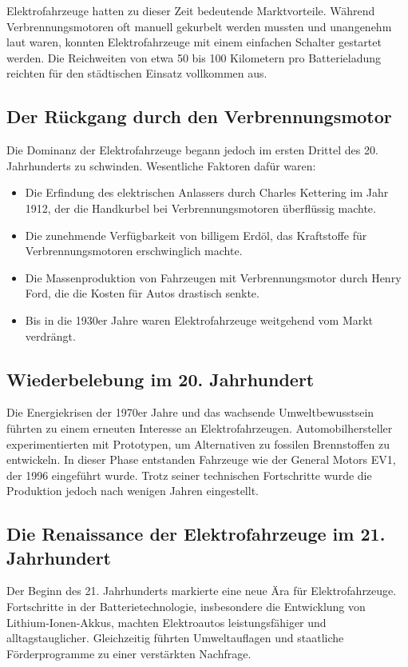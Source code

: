 Elektrofahrzeuge hatten zu dieser Zeit bedeutende Marktvorteile. Während Verbrennungsmotoren oft manuell gekurbelt werden mussten und unangenehm laut waren, konnten Elektrofahrzeuge mit einem einfachen Schalter gestartet werden. \autocite{enbw_elektroautos_vorteile_nachteile} Die Reichweiten von etwa 50 bis 100 Kilometern pro Batterieladung reichten für den städtischen Einsatz vollkommen aus. \autocite{adac_stromverbrauch_elektroautos}

\subsection*{Der Rückgang durch den Verbrennungsmotor}

Die Dominanz der Elektrofahrzeuge begann jedoch im ersten Drittel des 20. Jahrhunderts zu schwinden. Wesentliche Faktoren dafür waren:
\begin{itemize}
	\item Die Erfindung des elektrischen Anlassers durch Charles Kettering im Jahr 1912, der die Handkurbel bei Verbrennungsmotoren überflüssig machte. \autocite{greelane_charles_kettering}
	\item Die zunehmende Verfügbarkeit von billigem Erdöl, das Kraftstoffe für Verbrennungsmotoren erschwinglich machte. \autocite{tanke_guenstig_oelpreise}
	\item Die Massenproduktion von Fahrzeugen mit Verbrennungsmotor durch Henry Ford, die die Kosten für Autos drastisch senkte. \autocite{ardalpha_henry_ford_geschichte}
	\item Bis in die 1930er Jahre waren Elektrofahrzeuge weitgehend vom Markt verdrängt. \autocite{ardalpha_henry_ford_geschichte}
\end{itemize}

\subsection*{Wiederbelebung im 20. Jahrhundert}

Die Energiekrisen der 1970er Jahre und das wachsende Umweltbewusstsein führten zu einem erneuten Interesse an Elektrofahrzeugen. Automobilhersteller experimentierten mit Prototypen, um Alternativen zu fossilen Brennstoffen zu entwickeln. In dieser Phase entstanden Fahrzeuge wie der General Motors EV1, der 1996 eingeführt wurde. Trotz seiner technischen Fortschritte wurde die Produktion jedoch nach wenigen Jahren eingestellt.

\subsection*{Die Renaissance der Elektrofahrzeuge im 21. Jahrhundert}
Der Beginn des 21. Jahrhunderts markierte eine neue Ära für Elektrofahrzeuge. Fortschritte in der Batterietechnologie, insbesondere die Entwicklung von Lithium-Ionen-Akkus, machten Elektroautos leistungsfähiger und alltagstauglicher. Gleichzeitig führten Umweltauflagen und staatliche Förderprogramme zu einer verstärkten Nachfrage.

